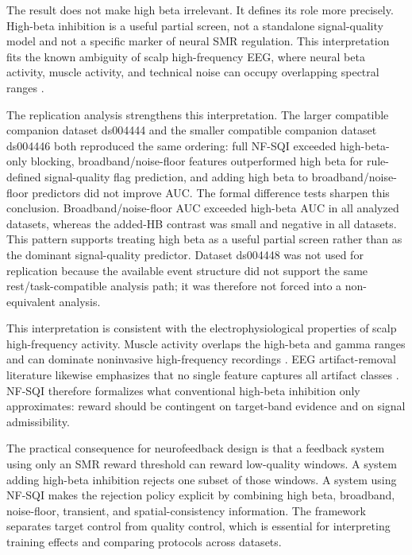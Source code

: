 \documentclass[preprint,12pt]{elsarticle}
\begin{document}
The result does not make high beta irrelevant. It defines its role more precisely. High-beta inhibition is a useful partial screen, not a standalone signal-quality model and not a specific marker of neural SMR regulation. This interpretation fits the known ambiguity of scalp high-frequency EEG, where neural beta activity, muscle activity, and technical noise can occupy overlapping spectral ranges \citep{Goncharova2003EMG,Whitham2007ScalpEMG,Muthukumaraswamy2013Muscle}.

The replication analysis strengthens this interpretation. The larger compatible companion dataset ds004444 and the smaller compatible companion dataset ds004446 both reproduced the same ordering: full NF-SQI exceeded high-beta-only blocking, broadband/noise-floor features outperformed high beta for rule-defined signal-quality flag prediction, and adding high beta to broadband/noise-floor predictors did not improve AUC. The formal difference tests sharpen this conclusion. Broadband/noise-floor AUC exceeded high-beta AUC in all analyzed datasets, whereas the added-HB contrast was small and negative in all datasets. This pattern supports treating high beta as a useful partial screen rather than as the dominant signal-quality predictor. Dataset ds004448 was not used for replication because the available event structure did not support the same rest/task-compatible analysis path; it was therefore not forced into a non-equivalent analysis.

This interpretation is consistent with the electrophysiological properties of scalp high-frequency activity. Muscle activity overlaps the high-beta and gamma ranges and can dominate noninvasive high-frequency recordings \citep{Muthukumaraswamy2013Muscle}. EEG artifact-removal literature likewise emphasizes that no single feature captures all artifact classes \citep{Jas2017Autoreject,Dhole2025ArtifactReview}. NF-SQI therefore formalizes what conventional high-beta inhibition only approximates: reward should be contingent on target-band evidence and on signal admissibility.

The practical consequence for neurofeedback design is that a feedback system using only an SMR reward threshold can reward low-quality windows. A system adding high-beta inhibition rejects one subset of those windows. A system using NF-SQI makes the rejection policy explicit by combining high beta, broadband, noise-floor, transient, and spatial-consistency information. The framework separates target control from quality control, which is essential for interpreting training effects and comparing protocols across datasets.
\end{document}
